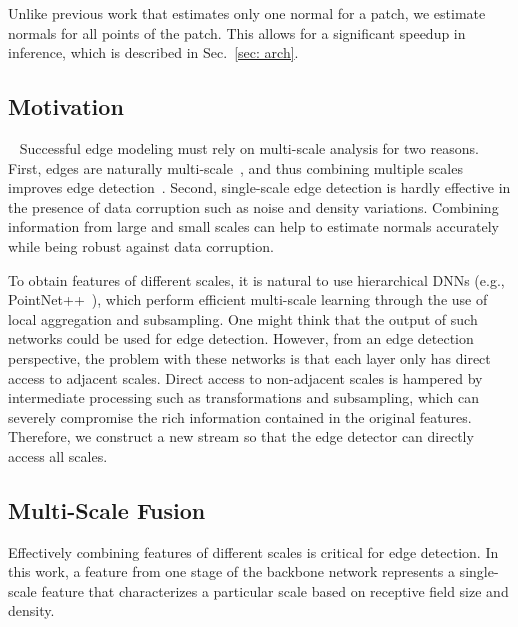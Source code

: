 \documentclass[sigconf]{acmart}
\begin{document}
Unlike previous work that estimates only one normal for a patch, we estimate normals for all points of the patch. This allows for a significant speedup in inference, which is described in Sec.~\ref{sec: arch}. 
            
\subsection{Motivation}~\label{sec: motivation}
Successful edge modeling must rely on multi-scale analysis for two reasons. First, edges are naturally multi-scale~\cite{marr1980theory}, and thus combining multiple scales improves edge detection~\cite{ren2008multi}. Second, single-scale edge detection is hardly effective in the presence of data corruption such as noise and density variations. Combining information from large and small scales can help to estimate normals accurately while being robust against data corruption.

To obtain features of different scales, it is natural to use hierarchical DNNs (e.g., PointNet++~\cite{qi2017pointnet++}), which perform efficient multi-scale learning through the use of local aggregation and subsampling. One might think that the output of such networks could be used for edge detection. However, from an edge detection perspective, the problem with these networks is that each layer only has direct access to adjacent scales. Direct access to non-adjacent scales is hampered by intermediate processing such as transformations and subsampling, which can severely compromise the rich information contained in the original features. Therefore, we construct a new stream so that the edge detector can directly access all scales.

\subsection{Multi-Scale Fusion}\label{sec: multi-scale fusion}
Effectively combining features of different scales is critical for edge detection. In this work, a feature from one stage of the backbone network represents a single-scale feature that characterizes a particular scale based on receptive field size and density. 
\end{document}
